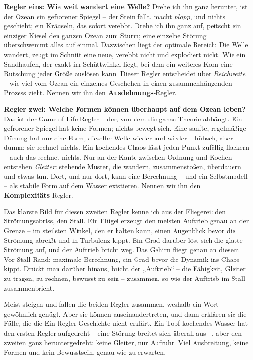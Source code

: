 \documentclass[11pt, twoside, openright]{book}
\begin{document}
\textbf{Regler eins: Wie weit wandert eine Welle?} Drehe ich ihn ganz herunter, ist der Ozean ein gefrorener Spiegel -- der Stein fällt, macht \textit{plopp}, und nichts geschieht; ein Kräuseln, das sofort verebbt. Drehe ich ihn ganz auf, peitscht ein einziger Kiesel den ganzen Ozean zum Sturm; eine einzelne Störung überschwemmt alles auf einmal. Dazwischen liegt der optimale Bereich: Die Welle wandert, zeugt im Schnitt eine neue, verebbt nicht und explodiert nicht. Wie ein Sandhaufen, der exakt im Schüttwinkel liegt, bei dem ein weiteres Korn eine Rutschung jeder Größe auslösen kann. Dieser Regler entscheidet über \textit{Reichweite} -- wie viel vom Ozean ein einzelnes Geschehen in einen zusammenhängenden Prozess zieht. Nennen wir ihn den \textbf{Ausdehnungs}-Regler.

\textbf{Regler zwei: Welche Formen können überhaupt auf dem Ozean leben?} Das ist der Game-of-Life-Regler -- der, von dem die ganze Theorie abhängt. Ein gefrorener Spiegel hat keine Formen; nichts bewegt sich. Eine sanfte, regelmäßige Dünung hat nur eine Form, dieselbe Welle wieder und wieder -- hübsch, aber dumm; sie rechnet nichts. Ein kochendes Chaos lässt jeden Punkt zufällig flackern -- auch das rechnet nichts. Nur an der Kante zwischen Ordnung und Kochen entstehen \textit{Gleiter}: stehende Muster, die wandern, zusammenstoßen, überdauern und etwas tun. Dort, und nur dort, kann eine Berechnung -- und ein Selbstmodell -- als stabile Form auf dem Wasser existieren. Nennen wir ihn den \textbf{Komplexitäts}-Regler.

Das klarste Bild für diesen zweiten Regler kenne ich aus der Fliegerei: den Strömungsabriss, den Stall. Ein Flügel erzeugt den meisten Auftrieb genau an der Grenze -- im steilsten Winkel, den er halten kann, einen Augenblick bevor die Strömung abreißt und in Turbulenz kippt. Ein Grad darüber löst sich die glatte Strömung auf, und der Auftrieb bricht weg. Das Gehirn fliegt genau an diesem Vor-Stall-Rand: maximale Berechnung, ein Grad bevor die Dynamik ins Chaos kippt. Drückt man darüber hinaus, bricht der „Auftrieb“ -- die Fähigkeit, Gleiter zu tragen, zu rechnen, bewusst zu sein -- zusammen, so wie der Auftrieb im Stall zusammenbricht.

Meist steigen und fallen die beiden Regler zusammen, weshalb ein Wort gewöhnlich genügt. Aber sie können auseinandertreten, und dann erklären sie die Fälle, die die Ein-Regler-Geschichte nicht erklärt. Ein Topf kochendes Wasser hat den ersten Regler aufgedreht -- eine Störung breitet sich überall aus --, aber den zweiten ganz heruntergedreht: keine Gleiter, nur Aufruhr. Viel Ausbreitung, keine Formen und kein Bewusstsein, genau wie zu erwarten.
\end{document}
